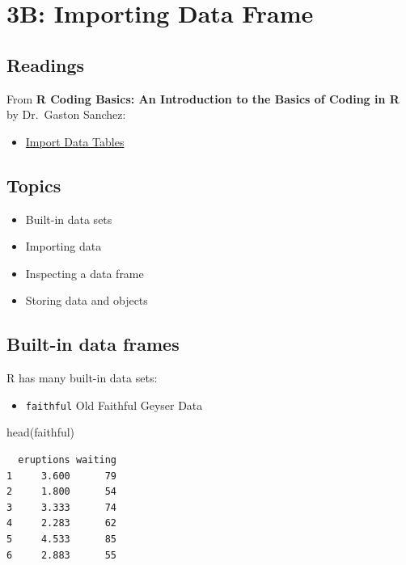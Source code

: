 \documentclass[
  letterpaper,
  DIV=11,
  numbers=noendperiod]{scrreprt}
\newenvironment{Shaded}{\begin{snugshade}}{\end{snugshade}}
\newcommand{\FunctionTok}[1]{\textcolor[rgb]{0.28,0.35,0.67}{#1}}
\newcommand{\NormalTok}[1]{\textcolor[rgb]{0.00,0.23,0.31}{#1}}
\providecommand{\tightlist}{%
  \setlength{\itemsep}{0pt}\setlength{\parskip}{0pt}}\usepackage{longtable,booktabs,array}
\begin{document}
\chapter{3B: Importing Data Frame}\label{b-importing-data-frame}

\section{Readings}\label{readings-4}

From \textbf{R Coding Basics: An Introduction to the Basics of Coding in
R} by Dr.~Gaston Sanchez:

\begin{itemize}
\tightlist
\item
  \href{https://www.gastonsanchez.com/R-coding-basics/6-02-import-tables.html}{Import
  Data Tables}
\end{itemize}

\section{Topics}\label{topics-5}

\begin{itemize}
\item
  Built-in data sets
\item
  Importing data
\item
  Inspecting a data frame
\item
  Storing data and objects
\end{itemize}

\section{Built-in data frames}\label{built-in-data-frames}

R has many built-in data sets:

\begin{itemize}
\tightlist
\item
  \texttt{faithful} Old Faithful Geyser Data
\end{itemize}

\begin{Shaded}
\begin{Highlighting}[]
\FunctionTok{head}\NormalTok{(faithful)}
\end{Highlighting}
\end{Shaded}

\begin{verbatim}
  eruptions waiting
1     3.600      79
2     1.800      54
3     3.333      74
4     2.283      62
5     4.533      85
6     2.883      55
\end{verbatim}
\end{document}
